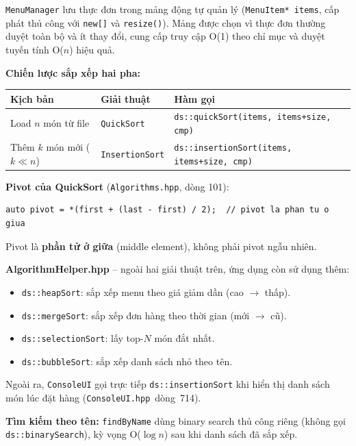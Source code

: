 \documentclass[12pt, a4paper]{article}
\begin{document}
\texttt{MenuManager} lưu thực đơn trong mảng động tự quản lý (\texttt{MenuItem* items}, cấp phát
thủ công với \texttt{new[]} và \texttt{resize()}). Mảng được chọn vì thực đơn thường duyệt toàn
bộ và ít thay đổi, cung cấp truy cập O(1) theo chỉ mục và duyệt tuyến tính O($n$) hiệu quả.

\textbf{Chiến lược sắp xếp hai pha:}

\begin{table}[H]
\centering
\begin{tabularx}{\textwidth}{llX}
\toprule
\textbf{Kịch bản} & \textbf{Giải thuật} & \textbf{Hàm gọi} \\
\midrule
Load $n$ món từ file & \texttt{QuickSort} & \texttt{ds::quickSort(items, items+size, cmp)} \\
Thêm $k$ món mới ($k \ll n$) & \texttt{InsertionSort} & \texttt{ds::insertionSort(items, items+size, cmp)} \\
\bottomrule
\end{tabularx}
\end{table}

\textbf{Pivot của QuickSort} (\texttt{Algorithms.hpp}, dòng 101):

\begin{lstlisting}
auto pivot = *(first + (last - first) / 2);  // pivot la phan tu o giua
\end{lstlisting}

Pivot là \textbf{phần tử ở giữa} (middle element), không phải pivot ngẫu nhiên.

\textbf{AlgorithmHelper.hpp} -- ngoài hai giải thuật trên, ứng dụng còn sử dụng thêm:
\begin{itemize}
  \item \texttt{ds::heapSort}: sắp xếp menu theo giá giảm dần (cao $\to$ thấp).
  \item \texttt{ds::mergeSort}: sắp xếp đơn hàng theo thời gian (mới $\to$ cũ).
  \item \texttt{ds::selectionSort}: lấy top-$N$ món đắt nhất.
  \item \texttt{ds::bubbleSort}: sắp xếp danh sách nhỏ theo tên.
\end{itemize}

Ngoài ra, \texttt{ConsoleUI} gọi trực tiếp \texttt{ds::insertionSort} khi hiển thị danh sách món
lúc đặt hàng (\texttt{ConsoleUI.hpp}~dòng~714).

\textbf{Tìm kiếm theo tên:} \texttt{findByName} dùng binary search thủ công riêng
(không gọi \texttt{ds::binarySearch}), kỳ vọng O($\log n$) sau khi danh sách đã sắp xếp.
\end{document}
